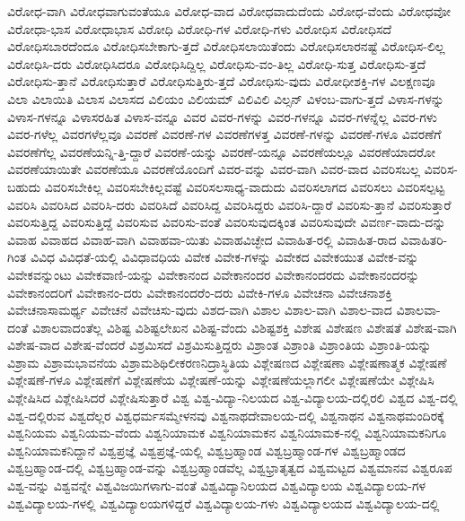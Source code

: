 {ವಿರೋಧ-ವಾಗಿ
ವಿರೋಧವಾಗುವಂತೆಯೂ
ವಿರೋಧ-ವಾದ
ವಿರೋಧವಾದುದೆಂದು
ವಿರೋಧ-ವೆಂದು
ವಿರೋಧವೋ
ವಿರೋಧಾ-ಭಾಸ
ವಿರೋಧಾಭಾಸ
ವಿರೋಧಿ
ವಿರೋಧಿ-ಗಳ
ವಿರೋಧಿ-ಗಳು
ವಿರೋಧಿಸ
ವಿರೋಧಿಸದೆ
ವಿರೋಧಿಸಬಾರದೆಂದೂ
ವಿರೋಧಿಸಬೇಕಾಗು-ತ್ತದೆ
ವಿರೋಧಿಸಲಾಯಿತೆಂದು
ವಿರೋಧಿಸಲಾರನಷ್ಟೆ
ವಿರೋಧಿಸ-ಲಿಲ್ಲ
ವಿರೋಧಿಸಿ-ದರು
ವಿರೋಧಿಸಿದರೂ
ವಿರೋಧಿಸಿದ್ದಿಲ್ಲ
ವಿರೋಧಿಸು-ವಂ-ತಿಲ್ಲ
ವಿರೋಧಿ-ಸುತ್ತ
ವಿರೋಧಿಸು-ತ್ತದೆ
ವಿರೋಧಿಸು-ತ್ತಾನೆ
ವಿರೋಧಿಸುತ್ತಾರೆ
ವಿರೋಧಿಸುತ್ತಿರು-ತ್ತದೆ
ವಿರೋಧಿಸು-ವುದು
ವಿರೋಧೀಶಕ್ತಿ-ಗಳ
ವಿಲಕ್ಷಣವೂ
ವಿಲಾ
ವಿಲಾಯಿತಿ
ವಿಲಾಸ
ವಿಲಾಸದ
ವಿಲಿಯಂ
ವಿಲಿಯಮ್
ವಿಲಿವಿಲಿ
ವಿಲ್ಸನ್
ವಿಳಂಬ-ವಾಗು-ತ್ತದೆ
ವಿಳಾಸ-ಗಳನ್ನು
ವಿಳಾಸ-ಗಳನ್ನೂ
ವಿಳಾಸರಹಿತ
ವಿಳಾಸ-ವನ್ನೂ
ವಿವರ
ವಿವರ-ಗಳನ್ನು
ವಿವರ-ಗಳನ್ನೂ
ವಿವರ-ಗಳನ್ನೆಲ್ಲ
ವಿವರ-ಗಳು
ವಿವರ-ಗಳೆಲ್ಲ
ವಿವರಗಳೆಲ್ಲವೂ
ವಿವರಣೆ
ವಿವರಣೆ-ಗಳ
ವಿವರಣೆಗಳತ್ತ
ವಿವರಣೆ-ಗಳನ್ನು
ವಿವರಣೆ-ಗಳೂ
ವಿವರಣೆಗೆ
ವಿವರಣೆಗೆಲ್ಲ
ವಿವರಣೆಯನ್ನಿ-ತ್ತಿ-ದ್ದಾರೆ
ವಿವರಣೆ-ಯನ್ನು
ವಿವರಣೆ-ಯನ್ನೂ
ವಿವರಣೆಯಲ್ಲೂ
ವಿವರಣೆಯಾದರೋ
ವಿವರಣೆಯಾಯಿತೇ
ವಿವರಣೆಯೂ
ವಿವರಣೆಯೊಂದಿಗೆ
ವಿವರ-ವನ್ನು
ವಿವರ-ವಾಗಿ
ವಿವರ-ವಾದ
ವಿವರಿಸಬಲ್ಲ
ವಿವರಿಸ-ಬಹುದು
ವಿವರಿಸಬೇಕಿಲ್ಲ
ವಿವರಿಸಬೇಕಿಲ್ಲವಷ್ಟೆ
ವಿವರಿಸಲಸಾಧ್ಯ-ವಾದುದು
ವಿವರಿಸಲಾಗದ
ವಿವರಿಸಲು
ವಿವರಿಸಲ್ಪಟ್ಟ
ವಿವರಿಸಿ
ವಿವರಿಸಿದ
ವಿವರಿಸಿ-ದರು
ವಿವರಿಸಿದೆ
ವಿವರಿಸಿದ್ದ
ವಿವರಿಸಿದ್ದರು
ವಿವರಿಸಿ-ದ್ದಾರೆ
ವಿವರಿಸು-ತ್ತಾನೆ
ವಿವರಿಸುತ್ತಾರೆ
ವಿವರಿಸುತ್ತಿದ್ದ
ವಿವರಿಸುತ್ತಿದ್ದೆ
ವಿವರಿಸುವ
ವಿವರಿಸು-ವಂತೆ
ವಿವರಿಸುವುದಕ್ಕಿಂತ
ವಿವರಿಸುವುದೇ
ವಿವರ್ಣ-ವಾದು-ದನ್ನು
ವಿವಾಹ
ವಿವಾಹದ
ವಿವಾಹ-ವಾಗಿ
ವಿವಾಹವಾ-ಯಿತು
ವಿವಾಹವಿಚ್ಛೇದ
ವಿವಾಹಿತ-ರಲ್ಲಿ
ವಿವಾಹಿತ-ರಾದ
ವಿವಾಹಿತರಿ-ಗಿಂತ
ವಿವಿಧ
ವಿವಿಧತೆ-ಯಲ್ಲಿ
ವಿವಿಧಾವಧಿಯ
ವಿವೇಕ
ವಿವೇಕ-ಗಳನ್ನು
ವಿವೇಕದ
ವಿವೇಕಯುತ
ವಿವೇಕ-ವನ್ನು
ವಿವೇಕವನ್ನುಂಟು
ವಿವೇಕವಾಣಿ-ಯನ್ನು
ವಿವೇಕಾನಂದ
ವಿವೇಕಾನಂದರ
ವಿವೇಕಾನಂದರದು
ವಿವೇಕಾನಂದರನ್ನು
ವಿವೇಕಾನಂದರಿಗೆ
ವಿವೇಕಾನಂ-ದರು
ವಿವೇಕಾನಂದರೆಂ-ದರು
ವಿವೇಕಿ-ಗಳೂ
ವಿವೇಚನಾ
ವಿವೇಚನಾಶಕ್ತಿ
ವಿವೇಚನಾಸಾಮರ್ಥ್ಯ
ವಿವೇಚನೆ
ವಿವೇಚಿಸು-ವುದು
ವಿಶದ-ವಾಗಿ
ವಿಶಾಲ
ವಿಶಾಲ-ವಾಗಿ
ವಿಶಾಲ-ವಾದ
ವಿಶಾಲವಾ-ದಂತೆ
ವಿಶಾಲವಾದಂತೆಲ್ಲ
ವಿಶಿಷ್ಟ
ವಿಶಿಷ್ಟಲೇಖನ
ವಿಶಿಷ್ಟ-ವೆಂದು
ವಿಶಿಷ್ಟಶಕ್ತಿ
ವಿಶೇಷ
ವಿಶೇಷಣ
ವಿಶೇಷತೆ
ವಿಶೇಷ-ವಾಗಿ
ವಿಶೇಷ-ವಾದ
ವಿಶೇಷ-ವೆಂದರೆ
ವಿಶ್ರಮಿಸದೆ
ವಿಶ್ರಮಿಸುತ್ತಿದ್ದರು
ವಿಶ್ರಾಂತ
ವಿಶ್ರಾಂತಿ
ವಿಶ್ರಾಂತಿಯ
ವಿಶ್ರಾಂತಿ-ಯನ್ನು
ವಿಶ್ರಾಮ
ವಿಶ್ರಾಮಭಾವನೆಯ
ವಿಶ್ರಾಮಶಿಥಿಲೀಕರಣನಿದ್ರಾಸ್ಥಿತಿಯ
ವಿಶ್ಲೇಷಣದ
ವಿಶ್ಲೇಷಣಾ
ವಿಶ್ಲೇಷಣಾತ್ಮಕ
ವಿಶ್ಲೇಷಣೆ
ವಿಶ್ಲೇಷಣೆ-ಗಳೂ
ವಿಶ್ಲೇಷಣೆಗೆ
ವಿಶ್ಲೇಷಣೆಯ
ವಿಶ್ಲೇಷಣೆ-ಯನ್ನು
ವಿಶ್ಲೇಷಣೆಯಲ್ಲಾಗಲೀ
ವಿಶ್ಲೇಷಣೆಯೇ
ವಿಶ್ಲೇಷಿಸಿ
ವಿಶ್ಲೇಷಿಸಿದ
ವಿಶ್ಲೇಷಿಸಿದರೆ
ವಿಶ್ಲೇಷಿಸುತ್ತಾರೆ
ವಿಶ್ವ
ವಿಶ್ವ-ವಿದ್ಯಾ-ನಿಲಯದ
ವಿಶ್ವ-ವಿದ್ಯಾಲಯ-ದಲ್ಲಿರಲಿ
ವಿಶ್ವದ
ವಿಶ್ವ-ದಲ್ಲಿ
ವಿಶ್ವ-ದಲ್ಲಿರುವ
ವಿಶ್ವದೆಲ್ಲರ
ವಿಶ್ವಧರ್ಮಸಮ್ಮೇಳನವು
ವಿಶ್ವನಾಥದೇವಾಲಯ-ದಲ್ಲಿ
ವಿಶ್ವನಾಥನ
ವಿಶ್ವನಾಥಮಂದಿರಕ್ಕೆ
ವಿಶ್ವನಿಯಮ
ವಿಶ್ವನಿಯಮ-ವೆಂದು
ವಿಶ್ವನಿಯಾಮಕ
ವಿಶ್ವನಿಯಾಮಕನ
ವಿಶ್ವನಿಯಾಮಕ-ನಲ್ಲಿ
ವಿಶ್ವನಿಯಾಮಕನಿಗೂ
ವಿಶ್ವನಿಯಾಮಕನಿದ್ದಾನೆ
ವಿಶ್ವಪ್ರಜ್ಞೆ
ವಿಶ್ವಪ್ರಜ್ಞೆ-ಯಲ್ಲಿ
ವಿಶ್ವಬ್ರಹ್ಮಾಂಡ
ವಿಶ್ವಬ್ರಹ್ಮಾಂಡ-ಗಳ
ವಿಶ್ವಬ್ರಹ್ಮಾಂಡದ
ವಿಶ್ವಬ್ರಹ್ಮಾಂಡ-ದಲ್ಲಿ
ವಿಶ್ವಬ್ರಹ್ಮಾಂಡ-ವನ್ನು
ವಿಶ್ವಬ್ರಹ್ಮಾಂಡವೆಲ್ಲ
ವಿಶ್ವಭ್ರಾತೃತ್ವದ
ವಿಶ್ವಮಟ್ಟದ
ವಿಶ್ವಮಾನವ
ವಿಶ್ವರೂಪ
ವಿಶ್ವ-ವನ್ನು
ವಿಶ್ವವನ್ನೇ
ವಿಶ್ವವಿಜಯಿಗಳಾಗು-ವಂತೆ
ವಿಶ್ವವಿದ್ಯಾನಿಲಯದ
ವಿಶ್ವವಿದ್ಯಾಲಯ
ವಿಶ್ವವಿದ್ಯಾಲಯ-ಗಳ
ವಿಶ್ವವಿದ್ಯಾಲಯ-ಗಳಲ್ಲಿ
ವಿಶ್ವವಿದ್ಯಾಲಯಗಳಿದ್ದರೆ
ವಿಶ್ವವಿದ್ಯಾಲಯ-ಗಳು
ವಿಶ್ವವಿದ್ಯಾಲಯದ
ವಿಶ್ವವಿದ್ಯಾಲಯ-ದಲ್ಲಿ
}
